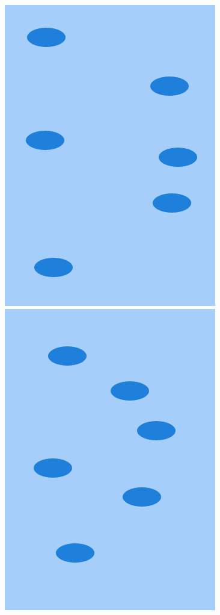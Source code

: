 \documentclass[11pt]{article}
\begin{document}
\begin{figure}[H]
\centerline{%
\includegraphics[scale=0.27]{pics/desktop.png}\hspace{2em}%
\includegraphics[scale=0.27]{pics/desktopresp.png}\hspace{2em}%
}
\end{figure}
\end{document}
